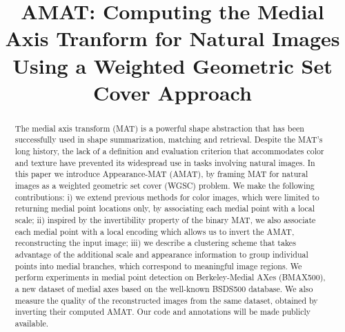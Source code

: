 \documentclass[10pt,twocolumn,letterpaper]{article}
\begin{document}
\title{AMAT: Computing the Medial Axis Tranform for Natural Images Using a Weighted Geometric Set Cover Approach}
\maketitle


\begin{abstract}
The medial axis transform (MAT) is a powerful shape abstraction that has been successfully
used in shape summarization, matching and retrieval. 
Despite the MAT's long history, the lack of a definition and evaluation criterion 
that accommodates color and texture have prevented its widespread use in tasks involving natural images.
In this paper we introduce Appearance-MAT (AMAT), by framing MAT 
for natural images as a weighted geometric set cover (WGSC) problem.
We make the following contributions: 
i) we extend previous methods for color images, which were limited to returning medial point locations only, 
by associating each medial point with a local scale; 
ii) inspired by the invertibility property of the binary MAT, we also associate each medial point with a local encoding
which allows us to invert the AMAT, reconstructing the input image; 
iii) we describe a clustering scheme that takes advantage of the additional scale and appearance information 
to group individual points into medial branches, which correspond to meaningful image regions.
We perform experiments in medial point detection on
Berkeley-Medial AXes (BMAX500), a new dataset of medial axes based on the well-known BSDS500 database.
We also measure the quality of the reconstructed images from the same dataset,
obtained by inverting their computed AMAT. 
Our code and annotations will be made publicly available.
\end{abstract}


\end{document}
